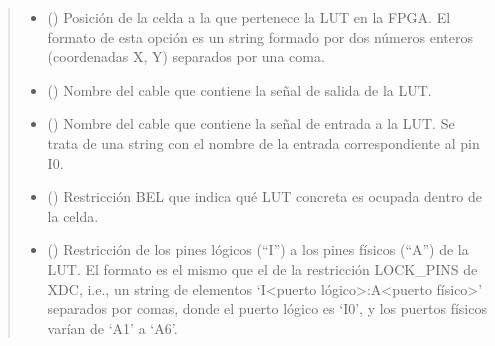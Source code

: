 \documentclass[letterpaper,10pt,english]{sphinxmanual}
\begin{document}
\begin{fulllineitems}
\begin{quote}
\begin{description}
\begin{itemize}
\sphinxAtStartPar
donde init{[}i{]} es el i\sphinxhyphen{}ésimo bit del número ‘init’ en representación binaria LSB (i.e., init{[}0{]} es el bit menos significativo \sphinxhyphen{}“más a la izquierda”\sphinxhyphen{} de init).


\item {} 
\sphinxAtStartPar
{} () \textendash{} Posición de la celda a la que pertenece la LUT en la FPGA. El formato de esta opción es un string formado por dos números enteros (coordenadas X, Y) separados por una coma.

\item {} 
\sphinxAtStartPar
{} () \textendash{} Nombre del cable que contiene la señal de salida de la LUT.

\item {} 
\sphinxAtStartPar
{} () \textendash{} Nombre del cable que contiene la señal de entrada a la LUT. Se trata de una string con el nombre de la entrada correspondiente al pin I0.

\item {} 
\sphinxAtStartPar
{} (\sphinxstyleliteralemphasis{\sphinxupquote{, }}\sphinxstyleliteralemphasis{\sphinxupquote{, }}\sphinxstyleliteralemphasis{\sphinxupquote{, }}) \textendash{} Restricción BEL que indica qué LUT concreta es ocupada dentro de la celda.

\item {} 
\sphinxAtStartPar
{} () \textendash{} Restricción de los pines lógicos (“I”) a los pines físicos (“A”) de la LUT. El formato es el mismo que el de la restricción LOCK\_PINS de XDC, i.e., un string de elementos ‘I\textless{}puerto lógico\textgreater{}:A\textless{}puerto físico\textgreater{}’ separados por comas, donde el puerto lógico es ‘I0’, y los puertos físicos varían de ‘A1’ a ‘A6’.


\end{itemize}
\end{description}
\end{quote}
\end{fulllineitems}
\end{document}
